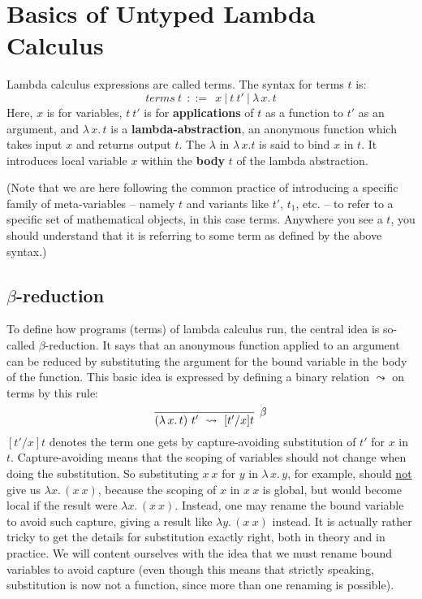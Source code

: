 \documentclass{article}
\begin{document}
\section{Basics of Untyped Lambda Calculus}

Lambda calculus expressions are called terms.  The syntax for terms $t$
is:
\[
\textit{terms}\ t\ \  ::=\ \  x\ |\ t\ t'\ |\ \lambda\,x.\, t
\]
\noindent Here, $x$ is for variables, $t\ t'$ is for
\textbf{applications} of $t$ as a function to $t'$ as an argument, and
$\lambda\,x.\, t$ is a \textbf{lambda-abstraction}, an anonymous
function which takes input $x$ and returns output $t$.  The $\lambda$
in $\lambda\,x.t$ is said to bind $x$ in $t$.  It introduces local
variable $x$ within the \textbf{body} $t$ of the lambda abstraction.

(Note that we are here following the common practice of introducing a
specific family of meta-variables -- namely $t$ and variants like
$t'$, $t_1$, etc. -- to refer to a specific set of mathematical
objects, in this case terms.  Anywhere you see a $t$, you should
understand that it is referring to some term as defined by the above
syntax.)

\subsection{$\beta$-reduction}

To define how programs (terms) of lambda calculus run, the central
idea is so-called $\beta$-reduction.  It says that an anonymous
function applied to an argument can be reduced by substituting the
argument for the bound variable in the body of the function.  This
basic idea is expressed by defining a binary relation $\leadsto$ on
terms by this rule:
\[
\infer[\beta]{(\lambda\,x.\, t)\ t'\ \leadsto\ [t'/x]t}
                                {\ }
\]
\noindent $[t'/x]t$ denotes the term one gets by capture-avoiding substitution
of $t'$ for $x$ in $t$.  Capture-avoiding means that the scoping of variables
should not change when doing the substitution.  So substituting $x\ x$ for $y$
in $\lambda\,x.\, y$, for example, should \underline{not} give us $\lambda x.\, (x\ x)$,
because the scoping of $x$ in $x\ x$ is global, but would become local
if the result were $\lambda x.\, (x\ x)$.  Instead, one may rename the bound variable
to avoid such capture, giving a result like $\lambda y.\, (x\ x)$ instead.  It
is actually rather tricky to get the details for substitution exactly right,
both in theory and in practice.  We will content ourselves with the idea
that we must rename bound variables to avoid capture (even though this means
that strictly speaking, substitution is now not a function, since more than
one renaming is possible).
\end{document}
